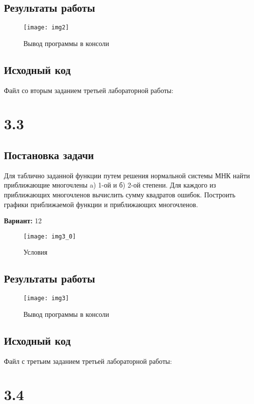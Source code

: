 \subsection{Результаты работы}
\begin{figure}[h!]
\centering
\texttt{[image: img2]}
\caption{Вывод программы в консоли}
\end{figure}
\pagebreak

\subsection{Исходный код}
Файл со вторым заданием третьей лабораторной работы:

\pagebreak

\section* {3.3}

\subsection{Постановка задачи}
Для таблично заданной функции путем решения нормальной системы МНК найти приближающие многочлены a) 1-ой  и б) 2-ой степени. Для каждого из приближающих многочленов вычислить сумму квадратов ошибок. Построить графики приближаемой функции и приближающих многочленов.

{\bfseries Вариант:} 12
\begin{figure}[h!]
\centering
\texttt{[image: img3\_0]}
\caption{Условия}
\end{figure}

\subsection{Результаты работы}
\begin{figure}[h!]
\centering
\texttt{[image: img3]}
\caption{Вывод программы в консоли}
\end{figure}
\pagebreak

\subsection{Исходный код}
Файл с третьим заданием третьей лабораторной работы:

\pagebreak

\section* {3.4}

